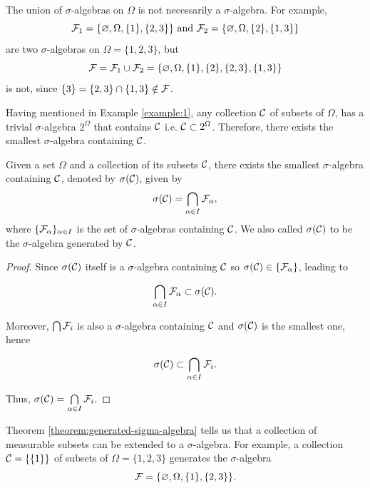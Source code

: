 \begin{remark}
 The union of $\sigma$-algebras on $\Omega$ is not necessarily a $\sigma$-algebra. For example,
 $$\mathcal{F}_1=\{\varnothing,\Omega, \{1\}, \{2,3\}\} \text{ and } \mathcal{F}_2=\{\varnothing,\Omega, \{2\}, \{1,3\}\}$$
 are two $\sigma$-algebras on $\Omega=\{1,2,3\}$, but
 $$\mathcal{F}=\mathcal{F}_1\cup\mathcal{F}_2=\{\varnothing,\Omega,\{1\},\{2\},\{2,3\},\{1,3\}\}$$ is not, since $\{3\}=\{2,3\}\cap\{1,3\}\notin \mathcal{F}$.
\end{remark}

Having mentioned in Example \ref{example:1}, any collection $\mathcal{C}$ of subsets of $\Omega$, has a trivial $\sigma$-algebra $2^\Omega$ that contains $\mathcal{C}$ i.e. $\mathcal{C}\subset2^\Omega$. Therefore, there exists the smallest $\sigma$-algebra containing $\mathcal{C}$.

\begin{theorem}
 \label{theorem:generated-sigma-algebra}
 Given a set $\Omega$ and a collection of its subsets $\mathcal{C}$, there exists the smallest $\sigma$-algebra containing $\mathcal{C}$, denoted by $\sigma(\mathcal{C})$, given by
 $$\sigma(\mathcal{C})=\bigcap\limits_{\alpha\in I}\mathcal{F}_\alpha,$$
 where $\{\mathcal{F}_\alpha\}_{\alpha\in I}$ is the set of $\sigma$-algebras containing $\mathcal{C}$. We also called $\sigma(\mathcal{C})$ to be the $\sigma$-algebra generated by $\mathcal{C}$.
\end{theorem}

\begin{proof}
 Since $\sigma(\mathcal{C})$ itself is a $\sigma$-algebra containing $\mathcal{C}$ so $\sigma(\mathcal{C})\in\{\mathcal{F}_\alpha\}$, leading to

 $$\bigcap\limits_{\alpha\in I}\mathcal{F}_\alpha\subset \sigma(\mathcal{C}).$$

 Moreover, $\bigcap\mathcal{F}_i$ is also a $\sigma$-algebra containing $\mathcal{C}$ and $\sigma(\mathcal{C})$ is the smallest one, hence

 $$\sigma(\mathcal{C})\subset\bigcap\limits_{\alpha\in I}\mathcal{F}_i.$$

 Thus, $\sigma(\mathcal{C})=\bigcap\limits_{\alpha\in I}\mathcal{F}_i$.
\end{proof}

\begin{remark}
 Theorem \ref{theorem:generated-sigma-algebra} tells us that a collection of measurable subsets can be extended to a $\sigma$-algebra. For example, a collection $\mathcal{C}=\{\{1\}\}$ of subsets of $\Omega=\{1,2,3\}$ generates the $\sigma$-algebra
 $$\mathcal{F}=\{\varnothing,\Omega,\{1\},\{2,3\}\}.$$
\end{remark}

